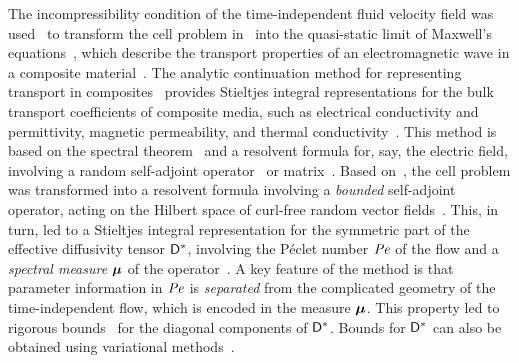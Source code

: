\documentclass[amsa]{ipart}
\begin{document}
The incompressibility condition of the time-independent fluid velocity
field was used~\cite{Avellaneda:PRL-753,Avellaneda:CMP-339} to
transform the cell problem in~\cite{McLaughlin:SIAM_JAM:780} into the
quasi-static limit of Maxwell's
equations~\cite{Jackson-1999,Golden:CMP-473}, which describe the
transport properties of an electromagnetic wave in a composite
material~\cite{MILTON:2002:TC}. The analytic continuation method for
representing transport in composites~\cite{Golden:CMP-473} provides
Stieltjes integral representations for the bulk transport coefficients
of composite media, such as electrical conductivity and permittivity,
magnetic permeability, and thermal
conductivity~\cite{MILTON:2002:TC}. This method is based on the
spectral theorem~\cite{Stone:64,Reed-1980} and a resolvent formula
for, say, the electric field, involving a random self-adjoint
operator~\cite{Golden:CMP-473,Murphy:JMP:063506} or
matrix~\cite{Murphy:2015:CMS:13:4:825}. Based on~\cite{Golden:CMP-473}, 
the cell problem was transformed into a resolvent formula involving a
\emph{bounded} self-adjoint operator, acting on the Hilbert
space of curl-free random vector
fields~\cite{Avellaneda:PRL-753,Avellaneda:CMP-339}. This, in turn,     
led to a Stieltjes integral representation for the symmetric part of
the effective diffusivity tensor $\mathsf{D}^*$, involving the P\'{e}clet
number $\mbox{\textit{Pe}}$ of the flow and a \emph{spectral measure} $\mbox{\boldmath${\mu}$}$ of the
operator~\cite{Avellaneda:PRL-753,Avellaneda:CMP-339}. A key feature
of the method is that parameter information in $\mbox{\textit{Pe}}$ is 
\emph{separated} from the complicated geometry of the time-independent
flow, which is encoded in the measure $\mbox{\boldmath${\mu}$}$. This property led to
rigorous bounds~\cite{Avellaneda:CMP-339} for the diagonal components
of $\mathsf{D}^*$. Bounds for $\mathsf{D}^*$ can also be obtained using variational 
methods~\cite{Avellaneda:CMP-339,Fannjiang:1994:SIAM_JAM:333,Fannjiang:1997:1033}.  
\end{document}
